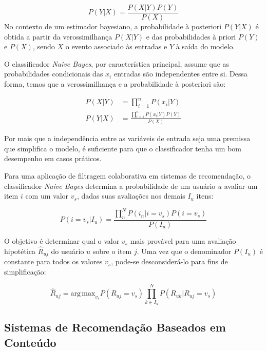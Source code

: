 \begin{equation}
    P(Y|X) = \frac{P(X|Y)P(Y)}{P(X)}
    \end{equation}
No contexto de um estimador bayesiano, a probabilidade à posteriori $P(Y|X)$ é
obtida a partir da verossimilhança $P(X|Y)$ e das probabilidades à priori $P(Y)$
e $P(X)$, sendo $X$ o evento associado às entradas e $Y$ à saída do modelo.

O classificador \textit{Naive Bayes}, por característica principal, assume que
as probabilidades condicionais das $x_i$ entradas são independentes entre si.
Dessa forma, temos que a verossimilhança e a probabilidade à posteriori são:

\begin{align}
    P(X|Y) &= \prod_{i=1}^{n}P(x_i|Y) \\
    P(Y|X) &= \frac{\prod_{i=1}^{n}P(x_i|Y)P(Y)}{P(X)}
\end{align}

Por mais que a independência entre as variáveis de entrada seja uma premissa
que simplifica o modelo, é suficiente para que o classificador tenha um bom
desempenho em casos práticos.

Para uma aplicação de filtragem colaborativa em sistemas de recomendação, o
classificador \textit{Naive Bayes} determina a probabilidade de um usuário $u$
avaliar um item $i$ com um valor $v_s$, dadas suas avaliações nos demais $I_u$
itens:

\begin{equation}
    P(i = v_s|I_u) = \frac{\prod_{n}^{N}P(i_{n}|i = v_s)P(i = v_s)}{P(I_u)}
\end{equation}

O objetivo é determinar qual o valor $v_s$ mais provável para uma avaliação
hipotética $\hat{R}_{uj}$ do usuário $u$ sobre o item $j$. Uma vez que o denominador $P(I_u)$
é constante para todos os valores $v_s$, pode-se desconsiderá-lo para fins de
simplificação:

\begin{equation}
    \hat{R}_{uj} = \mathrm{arg\,max}_{v_s} P(R_{uj} = v_s) \prod_{k \in I_{u}}^{N}P(R_{uk}|R_{uj} = v_s)
\end{equation}
    
\subsection{Sistemas de Recomendação Baseados em Conteúdo}

